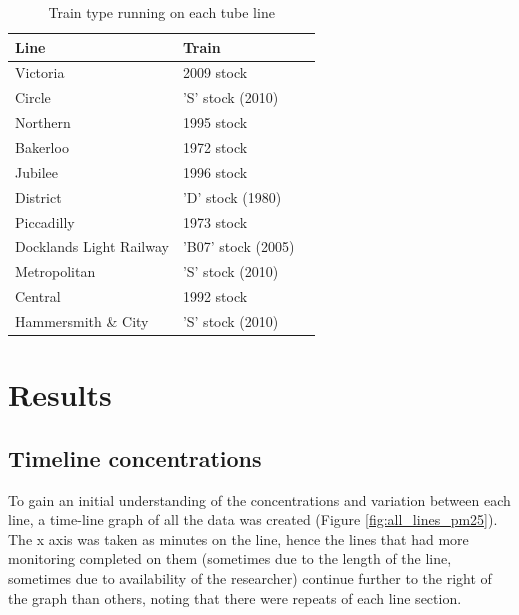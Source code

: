 \begin{table}[H]
\caption{Train type running on each tube line}
\centering
    \begin{tabular}{ | l | l | l |}
    \hline 
     \bfseries{Line} & \bfseries{Train}             \\ \hline
        Victoria                &   2009 stock      \\ \hline
        Circle                  &   'S' stock (2010)       \\ \hline
        Northern                &   1995 stock      \\ \hline
        Bakerloo                &   1972 stock      \\ \hline
        Jubilee                 &   1996 stock      \\ \hline
        District                &   'D' stock (1980)      \\ \hline
        Piccadilly              &   1973 stock      \\ \hline
        Docklands Light Railway &   'B07' stock (2005)     \\ \hline
        Metropolitan            &   'S' stock (2010)       \\ \hline
        Central                 &   1992 stock      \\ \hline
        Hammersmith \& City     &   'S' stock (2010)       \\ \hline
        \end{tabular}
\label{tab:train_type_on_the_underground}
\end{table}

\section{Results}
\label{sec:3results}

\subsection{Timeline concentrations}
\label{subsec:timeline_concentrations}

To gain an initial understanding of the concentrations and variation between each line, a time-line graph of all the data was created (Figure \ref{fig:all_lines_pm25}). The x axis was taken as minutes on the line, hence the lines that had more monitoring completed on them (sometimes due to the length of the line, sometimes due to availability of the researcher) continue further to the right of the graph than others, noting that there were repeats of each line section.

